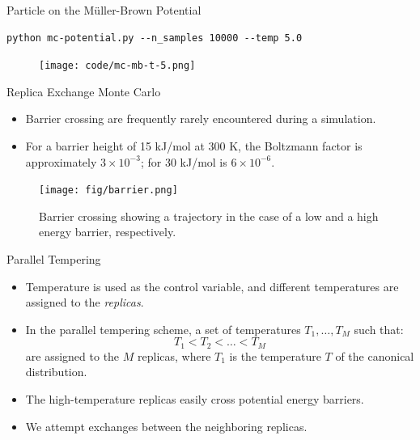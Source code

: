 \documentclass[10pt]{beamer}
\begin{document}
\begin{frame}[fragile]{Particle on the M\"uller-Brown Potential}
\begin{lstlisting}
python mc-potential.py --n_samples 10000 --temp 5.0
\end{lstlisting}
\vspace*{-0.3cm}
\begin{figure}
  \texttt{[image: code/mc-mb-t-5.png]}
\end{figure}
\end{frame}

\begin{frame}{Replica Exchange Monte Carlo}
\begin{itemize}
\setlength\itemsep{1em}
  \item Barrier crossing are frequently rarely encountered during a simulation.

  \item For a barrier height of 15 kJ/mol at 300 K, the Boltzmann factor is approximately $3\times 10^{-3}$; for 30 kJ/mol is $6\times 10^{-6}$.
\end{itemize}
\begin{figure}
  \texttt{[image: fig/barrier.png]}
  \caption{Barrier crossing showing a trajectory in the case of a low and a high energy barrier, respectively.}
\end{figure}
\end{frame}

\begin{frame}{Parallel Tempering}
\begin{itemize}
\setlength\itemsep{1em}
  \item Temperature is used as the control variable, and different temperatures are assigned to the \textit{replicas}.

  \item In the parallel tempering scheme, a set of temperatures $T_1,\dots,T_M$ such that:
  \begin{equation}
    T_1 < T_2 < \dots < T_M
  \end{equation}
  are assigned to the $M$ replicas, where $T_1$ is the temperature $T$ of the canonical distribution.

  \item The high-temperature replicas easily cross potential energy barriers.

  \item We attempt exchanges between the neighboring replicas.
\end{itemize}
\end{frame}
\end{document}
